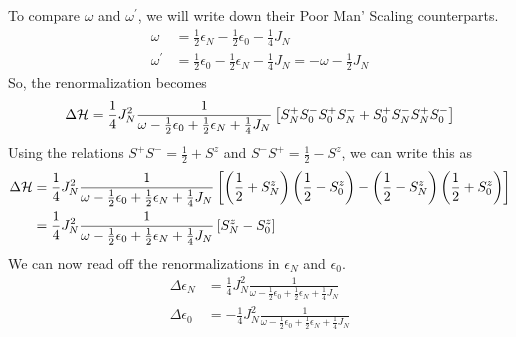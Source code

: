 \documentclass[12pt,twoside]{report}
\numberwithin{equation}{section}
\begin{document}
To compare \(\omega\) and \(\omega^\prime\), we will write down their Poor Man' Scaling counterparts.
\begin{equation}\begin{aligned}
	\omega &= \frac{1}{2}\epsilon_N - \frac{1}{2}\epsilon_0 - \frac{1}{4}J_N\\
	\omega^\prime &= \frac{1}{2}\epsilon_0 - \frac{1}{2}\epsilon_N - \frac{1}{4}J_N = -\omega - \frac{1}{2}J_N
\end{aligned}\end{equation}
So, the renormalization becomes
\begin{equation}
	\Delta \mathcal{H} = \frac{1}{4}J_N^2 \frac{1}{\omega - \frac{1}{2}\epsilon_0 + \frac{1}{2}\epsilon_N + \frac{1}{4}J_N}\left[S_N^+S_0^- S_0^+ S_N^- + S_0^+ S_N^- S_N^+S_0^-\right]
\end{equation}
Using the relations \(S^+ S^- = \frac{1}{2} + S^z\) and \(S^- S^+ = \frac{1}{2} - S^z\), we can write this as
\begin{equation}\begin{aligned}
	\Delta \mathcal{H} &= \frac{1}{4}J_N^2 \frac{1}{\omega - \frac{1}{2}\epsilon_0 + \frac{1}{2}\epsilon_N + \frac{1}{4}J_N}\left[\left(\frac{1}{2} + S_N^z\right)\left(\frac{1}{2} - S_0^z\right) - \left(\frac{1}{2} - S_N^z\right)\left(\frac{1}{2} + S_0^z\right)\right]\\
		    &= \frac{1}{4}J_N^2 \frac{1}{\omega - \frac{1}{2}\epsilon_0 + \frac{1}{2}\epsilon_N + \frac{1}{4}J_N}\left[S_N^z - S_0^z\right]
\end{aligned}\end{equation}
We can now read off the renormalizations in \(\epsilon_N\) and \(\epsilon_0\).
\begin{equation}\begin{aligned}
	\Delta \epsilon_N &= \frac{1}{4}J_N^2 \frac{1}{\omega - \frac{1}{2}\epsilon_0 + \frac{1}{2}\epsilon_N + \frac{1}{4}J_N}\\
	\Delta \epsilon_0 &= -\frac{1}{4}J_N^2 \frac{1}{\omega - \frac{1}{2}\epsilon_0 + \frac{1}{2}\epsilon_N + \frac{1}{4}J_N}
\end{aligned}\end{equation}
\end{document}
